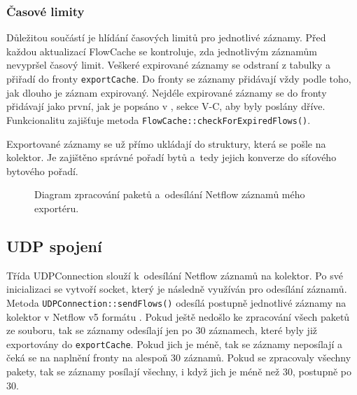 \documentclass[a4paper, 11pt]{article}
\begin{document}
\begin{sloppypar}
\subsubsection*{Časové limity} \label{timelimits}
Důležitou součástí je hlídání časových limitů pro jednotlivé záznamy. Před každou aktualizací FlowCache se kontroluje, zda jednotlivým záznamům nevypršel časový limit. Veškeré expirované záznamy se odstraní z tabulky a přiřadí do fronty \verb|exportCache|. Do fronty se záznamy přidávají vždy podle toho, jak dlouho je záznam expirovaný. Nejdéle expirované záznamy se do fronty přidávají jako první, jak je popsáno v  \cite{flows}, sekce V-C, aby byly poslány dříve. Funkcionalitu zajišťuje metoda \texttt{FlowCache::checkForExpiredFlows()}.

Exportované záznamy se už přímo ukládají do struktury, která se pošle na kolektor. Je zajištěno správné pořadí bytů a~tedy jejich konverze do síťového bytového pořadí.


\begin{figure}[ht]
    \begin{center}
        \caption{Diagram zpracování paketů a~odesílání Netflow záznamů mého exportéru.}
        \label{fig1}
    \end{center}
\end{figure}


\subsection{UDP spojení}
Třída UDPConnection slouží k~odesílání Netflow záznamů na kolektor. Po své inicializaci se vytvoří socket, který je následně využíván pro odesílání záznamů. Metoda \texttt{UDPConnection::sendFlows()} odesílá postupně jednotlivé záznamy na kolektor v Netflow v5 formátu \cite{netflow5}. Pokud ještě nedošlo ke zpracování všech paketů ze souboru, tak se záznamy odesílají jen po 30 záznamech, které byly již exportovány do \verb|exportCache|. Pokud jich je méně, tak se záznamy neposílají a čeká se na naplnění fronty na alespoň 30 záznamů. Pokud se zpracovaly všechny pakety, tak se záznamy posílají všechny, i když jich je méně než 30, postupně po 30.


\end{sloppypar}
\end{document}
